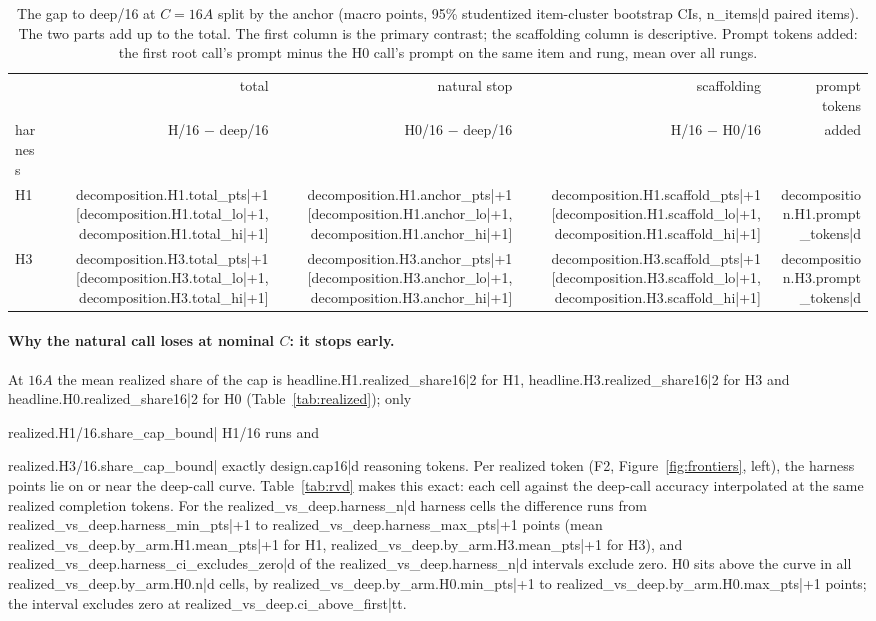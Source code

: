\documentclass[11pt]{article}
\begin{document}
{{{{{{{{\begin{table}[htbp]
\centering\small
\begin{tabular}{lrrrr}
\toprule
 & total & natural stop & scaffolding & prompt tokens \\
harness & H/16 $-$ deep/16 & H0/16 $-$ deep/16 & H/16 $-$ H0/16 & added \\
\midrule
H1 & {{decomposition.H1.total_pts|+1}} [{{decomposition.H1.total_lo|+1}}, {{decomposition.H1.total_hi|+1}}]
   & {{decomposition.H1.anchor_pts|+1}} [{{decomposition.H1.anchor_lo|+1}}, {{decomposition.H1.anchor_hi|+1}}]
   & {{decomposition.H1.scaffold_pts|+1}} [{{decomposition.H1.scaffold_lo|+1}}, {{decomposition.H1.scaffold_hi|+1}}]
   & {{decomposition.H1.prompt_tokens|d}} \\
H3 & {{decomposition.H3.total_pts|+1}} [{{decomposition.H3.total_lo|+1}}, {{decomposition.H3.total_hi|+1}}]
   & {{decomposition.H3.anchor_pts|+1}} [{{decomposition.H3.anchor_lo|+1}}, {{decomposition.H3.anchor_hi|+1}}]
   & {{decomposition.H3.scaffold_pts|+1}} [{{decomposition.H3.scaffold_lo|+1}}, {{decomposition.H3.scaffold_hi|+1}}]
   & {{decomposition.H3.prompt_tokens|d}} \\
\bottomrule
\end{tabular}
\caption{The gap to deep/16 at $C = 16A$ split by the anchor (macro points, 95\% studentized item-cluster
bootstrap CIs, {{n_items|d}} paired items). The two parts add up to the total. The first column is the primary
contrast; the scaffolding column is descriptive. Prompt tokens added: the first root call's prompt minus the H0
call's prompt on the same item and rung, mean over all rungs.}
\label{tab:decomp}
\end{table}

\paragraph{Why the natural call loses at nominal $C$: it stops early.} At $16A$ the mean realized share of the cap
is {{headline.H1.realized_share16|2}} for H1, {{headline.H3.realized_share16|2}} for H3 and
{{headline.H0.realized_share16|2}} for H0 (Table~\ref{tab:realized}); only {{realized.H1/16.share_cap_bound|%
H1/16 runs and {{realized.H3/16.share_cap_bound|%
exactly {{design.cap16|d}} reasoning tokens. Per realized token (F2, Figure~\ref{fig:frontiers}, left), the harness
points lie on or near the deep-call curve. Table~\ref{tab:rvd} makes this exact: each cell against the deep-call
accuracy interpolated at the same realized completion tokens. For the {{realized_vs_deep.harness_n|d}} harness
cells the difference runs from {{realized_vs_deep.harness_min_pts|+1}} to {{realized_vs_deep.harness_max_pts|+1}}
points (mean {{realized_vs_deep.by_arm.H1.mean_pts|+1}} for H1, {{realized_vs_deep.by_arm.H3.mean_pts|+1}} for
H3), and {{realized_vs_deep.harness_ci_excludes_zero|d}} of the {{realized_vs_deep.harness_n|d}} intervals exclude zero. H0 sits above the curve
in all {{realized_vs_deep.by_arm.H0.n|d}} cells, by {{realized_vs_deep.by_arm.H0.min_pts|+1}} to
{{realized_vs_deep.by_arm.H0.max_pts|+1}} points; the interval excludes zero at
{{realized_vs_deep.ci_above_first|tt}}.

}}}}}}}}}}}}
\end{document}
